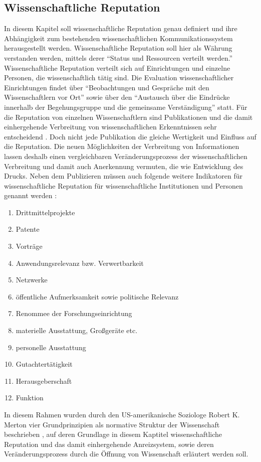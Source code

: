 \subsection{Wissenschaftliche Reputation}
In diesem Kapitel soll wissenschaftliche Reputation genau definiert und ihre Abhängigkeit zum bestehenden wissenschaftlichen Kommunikationssystem herausgestellt werden. Wissenschaftliche Reputation soll hier als Währung verstanden werden, mittels derer “Status und Ressourcen verteilt werden.”  Wissenschaftliche Reputation verteilt sich auf Einrichtungen und einzelne Personen, die wissenschaftlich tätig sind. Die Evaluation wissenschaftlicher Einrichtungen findet über “Beobachtungen und Gespräche mit den Wissenschaftlern vor Ort” sowie über den “Austausch über die Eindrücke innerhalb der Begehungsgruppe und die gemeinsame Verständigung”  statt. 
Für die Reputation von einzelnen Wissenschaftlern sind Publikationen und die damit einhergehende Verbreitung von wissenschaftlichen Erkenntnissen sehr entscheidend . Doch nicht jede Publikation die gleiche Wertigkeit  und Einfluss auf die Reputation. Die neuen Möglichkeiten der Verbreitung von Informationen lassen deshalb einen vergleichbaren Veränderungsprozess der wissenschaftlichen Verbreitung und damit auch Anerkennung vermuten, die wie Entwicklung des Drucks.  Neben dem Publizieren müssen auch folgende weitere Indikatoren für wissenschaftliche Reputation für wissenschaftliche Institutionen und Personen genannt werden :
\begin{enumerate}
\item Drittmittelprojekte
\item Patente
\item Vorträge
\item Anwendungsrelevanz bzw. Verwertbarkeit
\item Netzwerke
\item öffentliche Aufmerksamkeit sowie politische Relevanz 
\item Renommee der Forschungseinrichtung
\item materielle Ausstattung, Großgeräte etc.
\item personelle Ausstattung
\item Gutachtertätigkeit
\item Herausgeberschaft
\item Funktion
\end{enumerate}
In diesem Rahmen wurden durch den US-amerikanische Soziologe Robert K. Merton vier Grundprinzipien als normative Struktur der Wissenschaft beschrieben , auf deren Grundlage in diesem Kaptitel wissenschaftliche Reputation und das damit einhergehende Anreizsystem, sowie deren Veränderungsprozess durch die Öffnung von Wissenschaft erläutert werden soll. 
